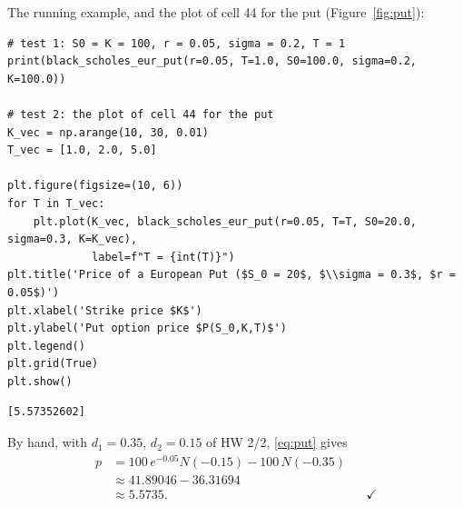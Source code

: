 \documentclass[11pt,a4paper]{article}
\newcommand{\subhead}[1]{\par\medskip\noindent{\large\bfseries #1}\par\smallskip\noindent\ignorespaces}
\begin{document}
\subhead{Test.} The running example, and the plot of cell 44 for the put (Figure~\ref{fig:put}):
\par\smallskip\noindent\begin{minipage}{\linewidth}\begin{lstlisting}[style=py,title={test of the put pricer}]
# test 1: S0 = K = 100, r = 0.05, sigma = 0.2, T = 1
print(black_scholes_eur_put(r=0.05, T=1.0, S0=100.0, sigma=0.2, K=100.0))

# test 2: the plot of cell 44 for the put
K_vec = np.arange(10, 30, 0.01)
T_vec = [1.0, 2.0, 5.0]

plt.figure(figsize=(10, 6))
for T in T_vec:
    plt.plot(K_vec, black_scholes_eur_put(r=0.05, T=T, S0=20.0, sigma=0.3, K=K_vec),
             label=f"T = {int(T)}")
plt.title('Price of a European Put ($S_0 = 20$, $\\sigma = 0.3$, $r = 0.05$)')
plt.xlabel('Strike price $K$')
plt.ylabel('Put option price $P(S_0,K,T)$')
plt.legend()
plt.grid(True)
plt.show()
\end{lstlisting}
\begin{lstlisting}[style=out,title={output}]
[5.57352602]
\end{lstlisting}\end{minipage}\par\smallskip
By hand, with $d_1=0.35$, $d_2=0.15$ of HW 2/2, \eqref{eq:put} gives
\begin{align*}
p &= 100\,e^{-0.05}N(-0.15)-100\,N(-0.35)\\
&\approx 41.89046-36.31694\\
&\approx 5.5735. && \checkmark
\end{align*}
\end{document}
